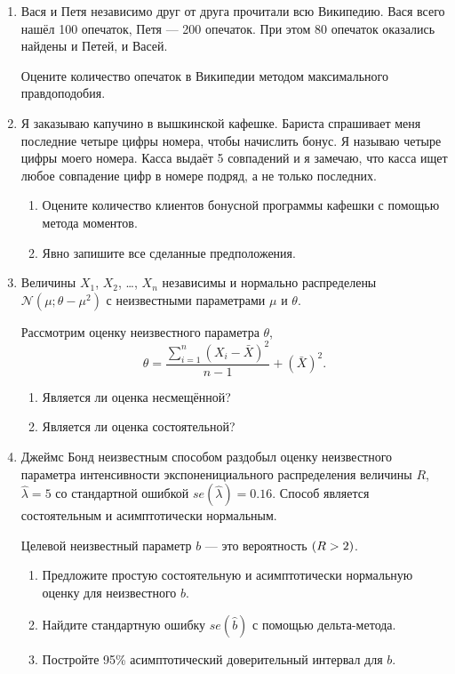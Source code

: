 \documentclass[12pt]{article}
\let\P\relax
\DeclareMathOperator{\P}{\mathbb{P}}
\newcommand \cN{\mathcal{N}}
\begin{document}
\begin{enumerate}

\item Вася и Петя независимо друг от друга прочитали всю Википедию. Вася всего нашёл 100
опечаток, Петя — 200 опечаток. При этом 80 опечаток оказались найдены и Петей, и Васей.


Оцените количество опечаток в Википедии методом максимального правдоподобия.

\item Я заказываю капучино в вышкинской кафешке. 
Бариста спрашивает меня последние четыре цифры номера, чтобы начислить бонус. 
Я называю четыре цифры моего номера.
Касса выдаёт 5 совпадений и я замечаю, что касса ищет любое совпадение цифр в номере подряд, а не только последних.

\begin{enumerate}
    \item Оцените количество клиентов бонусной программы кафешки с помощью метода моментов.
\item Явно запишите все сделанные предположения.
\end{enumerate}

\item   Величины $X_1$, $X_2$, \ldots, $X_n$ независимы и нормально распределены $\cN(\mu; \theta - \mu^2)$
с неизвестными параметрами $\mu$ и $\theta$.

Рассмотрим оценку неизвестного параметра $\theta$,
\[
\hat\theta = \frac{\sum_{i=1}^n (X_i - \bar X)^2}{n-1} + (\bar X)^2.
\]
\begin{enumerate}
  \item Является ли оценка несмещённой?
  \item Является ли оценка состоятельной?
\end{enumerate}


\item Джеймс Бонд неизвестным способом раздобыл оценку неизвестного параметра интенсивности экспоненициального распределения величины $R$,
$\hat\lambda = 5$ со стандартной ошибкой $se(\hat\lambda) = 0.16$. 
Способ является состоятельным и асимптотически нормальным.

Целевой неизвестный параметр $b$ — это вероятность $\P(R > 2)$.

\begin{enumerate}
    \item Предложите простую состоятельную и асимптотически нормальную оценку для неизвестного $b$.
    \item Найдите стандартную ошибку $se(\hat b)$ с помощью дельта-метода.
    \item Постройте 95\% асимптотический доверительный интервал для $b$.
\end{enumerate}


\end{enumerate}
\end{document}
